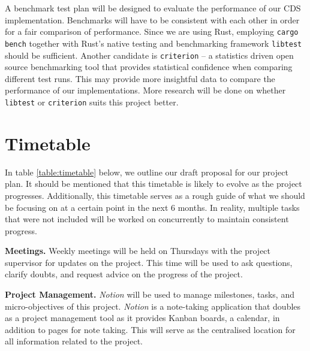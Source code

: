 A benchmark test plan will be designed to evaluate the performance of our CDS implementation. Benchmarks will have to be consistent with each other in order for a fair comparison of performance. Since we are using Rust, employing \texttt{cargo bench} together with Rust's native testing and benchmarking framework \texttt{libtest} should be sufficient. Another candidate is \texttt{criterion} -- a statistics driven open source benchmarking tool that provides statistical confidence when comparing different test runs. This may provide more insightful data to compare the performance of our implementations. More research will be done on whether \texttt{libtest} or \texttt{criterion} suits this project better.

\section{Timetable}
\label{sec:timetable}

In table \ref{table:timetable} below, we outline our draft proposal for our project plan. It should be mentioned that this timetable is likely to evolve as the project progresses. Additionally, this timetable serves as a rough guide of what we should be focusing on at a certain point in the next 6 months. In reality, multiple tasks that were not included will be worked on concurrently to maintain consistent progress. 

\textbf{Meetings.} Weekly meetings will be held on Thursdays with the project supervisor for updates on the project. This time will be used to ask questions, clarify doubts, and request advice on the progress of the project. 

\textbf{Project Management.} \textit{Notion} will be used to manage milestones, tasks, and micro-objectives of this project. \textit{Notion} is a note-taking application that doubles as a project management tool as it provides Kanban boards, a calendar, in addition to pages for note taking. This will serve as the centralised location for all information related to the project. 

